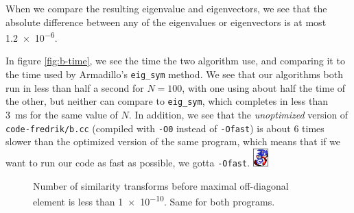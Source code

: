 \documentclass[11pt,a4paper]{article}
\begin{document}
When we compare the resulting eigenvalue and eigenvectors, we see that the absolute difference between any of the eigenvalues or eigenvectors is at most \num{1.2e-6}.

In figure \ref{fig:b-time}, we see the time the two algorithm use, and comparing it to the time used by Armadillo's \texttt{eig\_sym} method. We see that our algorithms both run in less than half a second for $N = 100$, with one using about half the time of the other, but neither can compare to \texttt{eig\_sym}, which completes in less than \SI{3}{\milli\second} for the same value of $N$. In addition, we see that the \emph{unoptimized} version of \texttt{code-fredrik/b.cc} (compiled with \texttt{-O0} instead of \texttt{-Ofast}) is about 6 times slower than the optimized version of the same program, which means that if we want to run our code as fast as possible, we gotta \texttt{-Ofast}. \includegraphics[trim=1 1 1 1,clip,width=0.6cm]{img/Sonic-run-1.png}

\begin{figure}[!ht]
  \centering

  \caption{Number of similarity transforms before maximal off-diagonal element is less than \num{1e-10}. Same for both programs.} \label{fig:b}
\end{figure}
\end{document}

